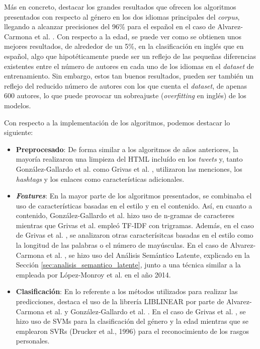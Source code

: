 \bigskip
Más en concreto, destacar los grandes resultados que
ofrecen los algoritmos presentados con respecto al género en los dos idiomas principales del \textit{corpus}, llegando a alcanzar
precisiones del 96\% para el español en el caso de Alvarez-Carmona et al. \cite{alvarez2015inaoe}. Con respecto a la edad,
se puede ver como se obtienen unos mejores resultados, de alrededor de un 5\%, en la clasificación en inglés que en español, algo que
hipotéticamente puede ser un reflejo de las pequeñas diferencias existentes entre el número de autores en cada uno de los idiomas en
el \textit{dataset} de entrenamiento. Sin embargo, estos tan buenos resultados, pueden ser también un reflejo del reducido número de
autores con los que cuenta el \textit{dataset}, de apenas 600 autores, lo que puede provocar un sobreajuste (\textit{overfitting} en inglés)
de los modelos.

\bigskip
Con respecto a la implementación de los algoritmos, podemos destacar lo siguiente:

\begin{itemize}
	\item \textbf{Preprocesado}: De forma similar a los algoritmos de años anteriores, la mayoría realizaron una limpieza del HTML incluído
	en los \textit{tweets} y, tanto González-Gallardo et al. \cite{gonzalez2015tweets} como Grivas et al. \cite{grivas2015author}, utilizaron
	las menciones, los \textit{hashtags} y los enlaces como características adicionales.
	\item \textbf{\textit{Features}}: En la mayor parte de los algoritmos presentados, se combinaba el uso de características
	basadas en el estilo y en el contenido. Así, en cuanto a contenido, González-Gallardo et al. \cite{gonzalez2015tweets} hizo uso de n-gramas de caracteres
	mientras que Grivas et al. \cite{grivas2015author} empleó TF-IDF con trigramas. Además, en el caso de Grivas et al. \cite{grivas2015author},
	se analizaron otras caracterísitcas basadas en el estilo como la longitud de las palabras o el número de mayúsculas. En el caso de Alvarez-Carmona et al. \cite{alvarez2015inaoe},
	se hizo uso del Análisis Semántico Latente, explicado en la Sección \ref{sec:analisis_semantico_latente}, junto a una técnica similar a la empleada por
	López-Monroy et al. \cite{lopez2014using} en el año 2014.
	\item \textbf{Clasificación}: En lo referente a los métodos utilizados para realizar las predicciones, destaca el uso de la librería LIBLINEAR \cite{fan2008liblinear}
	por parte de Alvarez-Carmona et al. \cite{alvarez2015inaoe} y González-Gallardo et al. \cite{gonzalez2015tweets}. En el caso de Grivas et al. \cite{grivas2015author}, se hizo
	uso de SVMs para la clasificación del género y la edad mientras que se emplearon SVRs (Drucker et al., 1996) \cite{drucker1996support} para el reconocimiento de los rasgos personales.
\end{itemize}

